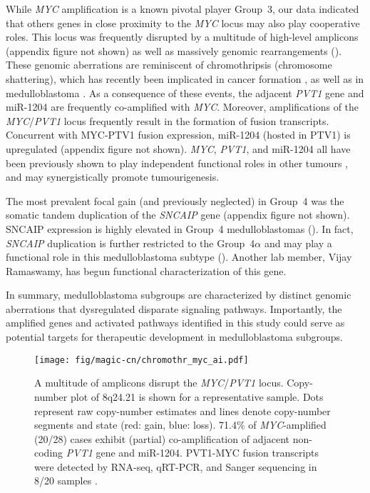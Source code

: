 While \emph{MYC} amplification is a known pivotal player Group~3, our data indicated that others genes in close proximity to the \emph{MYC} locus may also play cooperative roles. This locus was frequently disrupted by a multitude of high-level amplicons (appendix figure not shown) as well as massively genomic rearrangements (). These genomic aberrations are reminiscent of chromothripsis (chromosome shattering), which has recently been implicated in cancer formation , as well as in medulloblastoma . As a consequence of these events, the adjacent \emph{PVT1} gene and miR-1204 are frequently co-amplified with \emph{MYC}. Moreover, amplifications of the \emph{MYC}/\emph{PVT1} locus frequently result in the formation of fusion transcripts. Concurrent with MYC-PTV1 fusion expression, miR-1204 (hosted in PTV1) is upregulated (appendix figure not shown). \emph{MYC}, \emph{PVT1}, and miR-1204 all have been previously shown to play independent functional roles in other tumours , and may synergistically promote tumourigenesis.

The most prevalent focal gain (and previously neglected) in Group~4 was the somatic tandem duplication of the \emph{SNCAIP} gene (appendix figure not shown). SNCAIP expression is highly elevated in Group~4 medulloblastomas (). In fact, \emph{SNCAIP} duplication is further restricted to the Group~4$\alpha$ and may play a functional role in this medulloblastoma subtype (). Another lab member, Vijay Ramaswamy, has begun functional characterization of this gene.

In summary, medulloblastoma subgroups are characterized by distinct genomic aberrations that dysregulated disparate signaling pathways. Importantly, the amplified genes and activated pathways identified in this study could serve as potential targets for therapeutic development in medulloblastoma subgroups.


\clearpage


\begin{figure}[t]
	\begin{center}
		\texttt{[image: fig/magic-cn/chromothr\_myc\_ai.pdf]}
	\end{center}
	\caption[A multitude of amplicons disrupt the \emph{MYC}/\emph{PVT1} locus]
	{
	A multitude of amplicons disrupt the \emph{MYC}/\emph{PVT1} locus.
	Copy-number plot of 8q24.21 is shown for a representative sample. Dots represent raw copy-number estimates and lines denote copy-number segments and state (red: gain, blue: loss). 71.4\% of \emph{MYC}-amplified (20/28) cases exhibit (partial) co-amplification of adjacent non-coding \emph{PVT1} gene and miR-1204. PVT1-MYC fusion transcripts were detected by RNA-seq, qRT-PCR, and Sanger sequencing in 8/20 samples .
	}
	\label{fig:chromothr_myc}
\end{figure}

